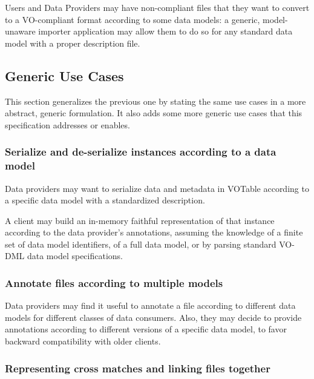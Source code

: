 \documentclass[11pt,a4paper]{ivoa}
\begin{document}
Users and Data Providers may have non-compliant files that they want to
convert to a VO-compliant format according to some data models: a
generic, model-unaware importer application may allow them to do so for
any standard data model with a proper description file.

\subsection{Generic Use Cases}\label{generic-use-cases}

This section generalizes the previous one by stating the same use cases
in a more abstract, generic formulation. It also adds some more generic
use cases that this specification addresses or enables.

\subsubsection{Serialize and de-serialize instances according to a data
model}\label{serialize-and-de-serialize-instances-according-to-a-data-model}

Data providers may want to serialize data and metadata in VOTable
according to a specific data model with a standardized description.

A client may build an in-memory faithful representation of that instance
according to the data provider's annotations, assuming the knowledge of
a finite set of data model identifiers, of a full data model, or by
parsing standard VO-DML data model specifications.

\subsubsection{Annotate files according to multiple
models}\label{annotate-files-according-to-multiple-models}

Data providers may find it useful to annotate a file according to
different data models for different classes of data consumers. Also,
they may decide to provide annotations according to different versions
of a specific data model, to favor backward compatibility with older
clients.

\subsubsection{Representing cross matches and linking files
together}\label{representing-cross-matches-and-linking-files-together}
\end{document}
